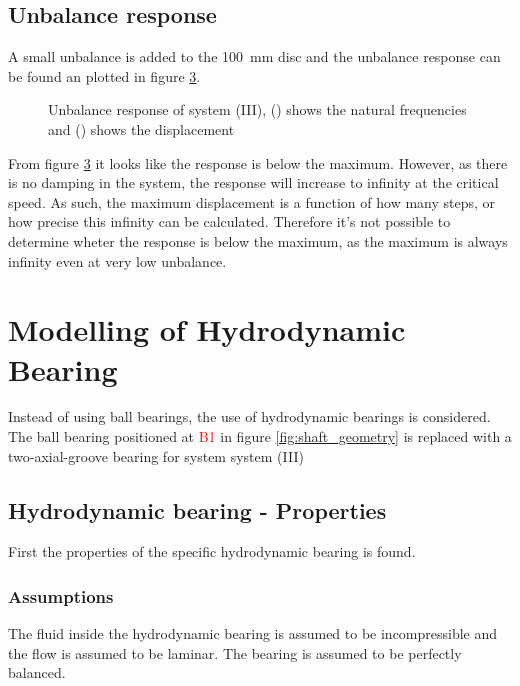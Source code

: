 \subsection{Unbalance response \label{sec:unbalance_response_ball_bearing}}
A small unbalance is added to the \SI{100}{\milli \meter} disc and the unbalance response can be found an plotted in figure \ref{fig:unbalance_response}.
\begin{figure}[htbp]
\begin{subfigure}[t]{0.49\textwidth}
    \centering
    
    \caption{}
    \label{fig:unbalance_response_natural}
\end{subfigure}
\hfill
\begin{subfigure}[t]{0.49\textwidth}
    \centering
    
    \caption{}
    \label{fig:unbalance_response_disp}
\end{subfigure}
\caption{Unbalance response of system (III), () shows the natural frequencies and () shows the displacement}
\label{fig:unbalance_response}
\end{figure}
From figure \ref{fig:unbalance_response} it looks like the response is below the maximum. However, as there is no damping in the system,
the response will increase to infinity at the critical speed. As such, the maximum displacement is a function of how many steps, or how precise this infinity can be calculated.
Therefore it's not possible to determine wheter the response is below the maximum, as the maximum is always infinity even at very low unbalance.

\section{Modelling of Hydrodynamic Bearing}
Instead of using ball bearings, the use of hydrodynamic bearings is considered. The ball bearing positioned at \textcolor{red}{B1} in figure \ref{fig:shaft_geometry} is replaced with a two-axial-groove bearing for system  system (III)

\subsection{Hydrodynamic bearing - Properties}
First the properties of the specific hydrodynamic bearing is found.

\subsubsection{Assumptions}
The fluid inside the hydrodynamic bearing is assumed to be incompressible and the flow is assumed to be laminar. The bearing is assumed to be perfectly balanced.

